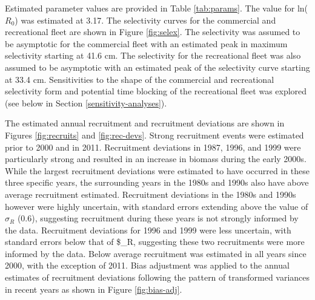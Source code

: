 \documentclass[11pt,
  english,
  letterpaper,
]{article}
\begin{document}
\leavevmode\tagmcend\tagstructend


Estimated parameter values are provided in Table \ref{tab:params}. The value for ln({\(R_0\)\leavevmode\tagmcend\tagstructend}) was estimated at 3.17. The selectivity curves for the commercial and recreational fleet are shown in Figure \ref{fig:selex}. The selectivity was assumed to be asymptotic for the commercial fleet with an estimated peak in maximum selectivity starting at 41.6 cm. The selectivity for the recreational fleet was also assumed to be asymptotic with an estimated peak of the selectivity curve starting at 33.4 cm. Sensitivities to the shape of the commercial and recreational selectivity form and potential time blocking of the recreational fleet was explored (see below in Section \ref{sensitivity-analyses}).

\leavevmode\tagmcend\tagstructend\par


The estimated annual recruitment and recruitment deviations are shown in Figures \ref{fig:recruits} and \ref{fig:rec-devs}. Strong recruitment events were estimated prior to 2000 and in 2011. Recruitment deviations in 1987, 1996, and 1999 were particularly strong and resulted in an increase in biomass during the early 2000s. While the largest recruitment deviations were estimated to have occurred in these three specific years, the surrounding years in the 1980s and 1990s also have above average recruitment estimated. Recruitment deviations in the 1980s and 1990s however were highly uncertain, with standard errors extending above the value of {\(\sigma_R\)\leavevmode\tagmcend\tagstructend} (0.6), suggesting recruitment during these years is not strongly informed by the data. Recruitment deviations for 1996 and 1999 were less uncertain, with standard errors below that of \$\sigma\_R, suggesting these two recruitments were more informed by the data. Below average recruitment was estimated in all years since 2000, with the exception of 2011. Bias adjustment was applied to the annual estimates of recruitment deviations following the pattern of transformed variances in recent years as shown in Figure \ref{fig:bias-adj}.

\leavevmode\tagmcend\tagstructend\par
\end{document}
